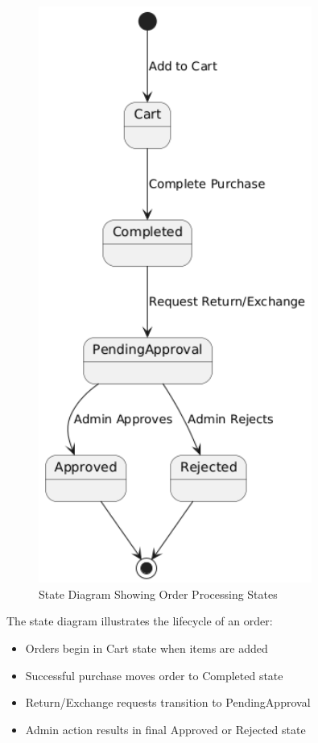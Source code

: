 \documentclass[12pt,a4paper]{article}
\begin{document}
\begin{figure}[H]
    \centering
    \includegraphics[width=0.8\textwidth]{docs/diagrams/state_diagram.png}
    \caption{State Diagram Showing Order Processing States}
\end{figure}

The state diagram illustrates the lifecycle of an order:
\begin{itemize}
    \item Orders begin in Cart state when items are added
    \item Successful purchase moves order to Completed state
    \item Return/Exchange requests transition to PendingApproval
    \item Admin action results in final Approved or Rejected state
\end{itemize}
\end{document}
